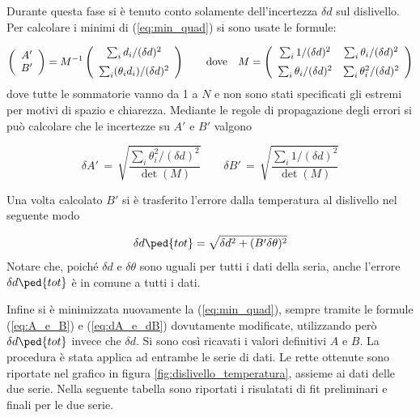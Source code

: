 Durante questa fase si è tenuto conto solamente dell'incertezza $\delta d$ sul dislivello. Per calcolare i minimi
di (\ref{eq:min_quad}) si sono usate le formule:

\begin{equation}
    \left(
    \begin{array}{c}
        A' \\
        B'
    \end{array} 
    \right)
    =
    M^{-1}
    \left(
    \begin{array}{c}
        \sum_i d_i/(\delta d)^2 \\[2mm]
        \sum_i (\theta_i d_i)/(\delta d)^2
    \end{array} 
    \right)
    \qquad 
    \text{dove}
    \quad
    M =
    \left(
    \begin{array}{c c}
        \sum_i 1/(\delta d)^2 & \sum_i \theta_i/(\delta d)^2 \\[2mm]
        \sum_i \theta_i/(\delta d)^2 & \sum_i \theta_i^2/(\delta d)^2
    \end{array} 
    \right)
    \label{eq:A_e_B}
\end{equation}
%
dove tutte le sommatorie vanno da 1 a $N$ e non sono stati specificati gli estremi per motivi di spazio e chiarezza. Mediante le regole
di propagazione degli errori si può calcolare che le incertezze su $A'$ e $B'$ valgono

\begin{equation}
    \delta A' \,=\, \sqrt{\frac{\sum_i \theta_i^2/(\delta d)^2}{\det(M)}}
    \qquad
    \delta B' \,=\, \sqrt{\frac{\sum_i 1/(\delta d)^2}{\det(M)}}
    \label{eq:dA_e_dB}
\end{equation}

Una volta calcolato $B'$ si è trasferito l'errore dalla temperatura al dislivello nel seguente modo

\begin{equation}
    \delta d\ped{tot} = \sqrt{\delta d^2 + (B'\delta \theta)^2}
    \label{eq:err_tras_1}
\end{equation}
%
Notare che, poiché $\delta d$ e $\delta \theta$ sono uguali per tutti i dati della seria,
anche l'errore $\delta d\ped{tot}$ è in comune a tutti i dati.

Infine si è minimizzata nuovamente la (\ref{eq:min_quad}), sempre tramite le formule (\ref{eq:A_e_B}) e (\ref{eq:dA_e_dB})
dovutamente modificate, utilizzando però $\delta d\ped{tot}$ invece che $\delta d$.
%
Si sono così ricavati i valori definitivi $A$ e $B$. La procedura è stata applica ad entrambe le serie di dati.
Le rette ottenute sono riportate nel grafico in figura \ref{fig:dislivello_temperatura}, assieme ai dati delle due serie.
Nella seguente tabella sono riportati i risulatati di fit preliminari e finali per le due serie.

